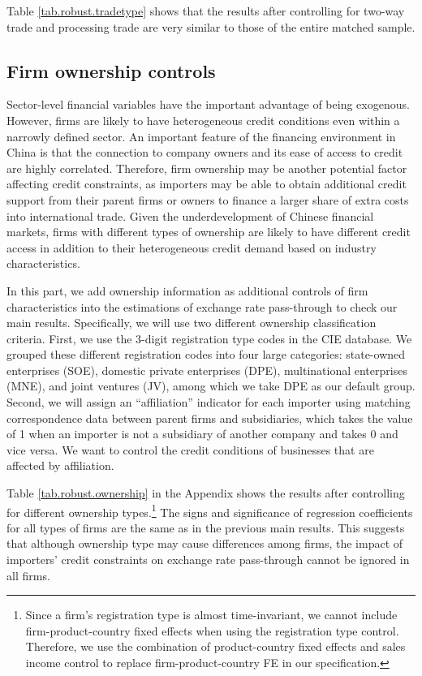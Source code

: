 Table \ref{tab.robust.tradetype} shows that the results after controlling for two-way trade and processing trade are very similar to those of the entire matched sample.

\subsection{Firm ownership controls}

Sector-level financial variables have the important advantage of being exogenous. However, firms are likely to have heterogeneous credit conditions even within a narrowly defined sector. An important feature of the financing environment in China is that the connection to company owners and its ease of access to credit are highly correlated. Therefore, firm ownership may be another potential factor affecting credit constraints, as importers may be able to obtain additional credit support from their parent firms or owners to finance a larger share of extra costs into international trade. Given the underdevelopment of Chinese financial markets, firms with different types of ownership are likely to have different credit access in addition to their heterogeneous credit demand based on industry characteristics. 

In this part, we add ownership information as additional controls of firm characteristics into the estimations of exchange rate pass-through to check our main results. Specifically, we will use two different ownership classification criteria. First, we use the 3-digit registration type codes in the CIE database. We grouped these different registration codes into four large categories: state-owned enterprises (SOE), domestic private enterprises (DPE), multinational enterprises (MNE), and joint ventures (JV), among which we take DPE as our default group. Second, we will assign an ``affiliation'' indicator for each importer using matching correspondence data between parent firms and subsidiaries, which takes the value of 1 when an importer is not a subsidiary of another company and takes 0 and vice versa. We want to control the credit conditions of businesses that are affected by affiliation.

Table \ref{tab.robust.ownership} in the Appendix shows the results after controlling for different ownership types.\footnote{Since a firm's registration type is almost time-invariant, we cannot include firm-product-country fixed effects when using the registration type control. Therefore, we use the combination of product-country fixed effects and sales income control to replace firm-product-country FE in our specification.} The signs and significance of regression coefficients for all types of firms are the same as in the previous main results. This suggests that although ownership type may cause differences among firms, the impact of importers' credit constraints on exchange rate pass-through cannot be ignored in all firms.

